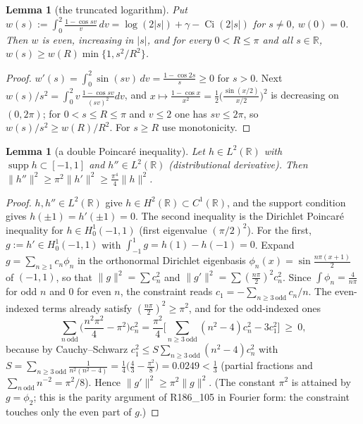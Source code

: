\documentclass[11pt]{amsart}
\newtheorem{lemma}[theorem]{Lemma}
\theoremstyle{definition}
\theoremstyle{remark}
\newcommand{\R}{\mathbb R}
\newcommand{\supp}{\operatorname{supp}}
\begin{document}
\begin{lemma}[the truncated logarithm]\label{lem:coer-w}
Put $w(s):=\int_0^2\frac{1-\cos sv}v\,dv=\log(2|s|)+\gamma-\operatorname{Ci}(2|s|)$ for $s\ne0$, $w(0)=0$.
Then $w$ is even, increasing in $|s|$, and for every $0<R\le\pi$ and all $s\in\R$,
$w(s)\ge w(R)\min\{1,s^2/R^2\}$.
\end{lemma}
\begin{proof}
$w'(s)=\int_0^2\sin(sv)\,dv=\frac{1-\cos2s}s\ge0$ for $s>0$. Next $w(s)/s^2=\int_0^2v\,\frac{1-\cos sv}{(sv)^2}dv$,
and $x\mapsto\frac{1-\cos x}{x^2}=\frac12\big(\frac{\sin(x/2)}{x/2}\big)^2$ is decreasing on $(0,2\pi)$;
for $0<s\le R\le\pi$ and $v\le2$ one has $sv\le2\pi$, so $w(s)/s^2\ge w(R)/R^2$. For $s\ge R$ use monotonicity.
\end{proof}

\begin{lemma}[a double Poincar\'e inequality]\label{lem:coer-poinc}
Let $h\in L^2(\R)$ with $\supp h\subset[-1,1]$ and $h''\in L^2(\R)$ (distributional derivative). Then
$\|h''\|^2\ge\pi^2\|h'\|^2\ge\frac{\pi^4}4\|h\|^2$.
\end{lemma}
\begin{proof}
$h,h''\in L^2(\R)$ give $h\in H^2(\R)\subset C^1(\R)$, and the support condition gives $h(\pm1)=h'(\pm1)=0$.
The second inequality is the Dirichlet Poincar\'e inequality for $h\in H^1_0(-1,1)$ (first eigenvalue
$(\pi/2)^2$). For the first, $g:=h'\in H^1_0(-1,1)$ with $\int_{-1}^1g=h(1)-h(-1)=0$. Expand $g=\sum_{n\ge1}c_n\phi_n$
in the orthonormal Dirichlet eigenbasis $\phi_n(x)=\sin\frac{n\pi(x+1)}2$ of $(-1,1)$, so that
$\|g\|^2=\sum c_n^2$ and $\|g'\|^2=\sum(\frac{n\pi}2)^2c_n^2$. Since $\int\phi_n=\frac4{n\pi}$ for odd $n$ and
$0$ for even $n$, the constraint reads $c_1=-\sum_{n\ge3\ \mathrm{odd}}c_n/n$. The even-indexed terms already
satisfy $(\frac{n\pi}2)^2\ge\pi^2$, and for the odd-indexed ones
\[
\sum_{n\ \mathrm{odd}}\Big(\frac{n^2\pi^2}4-\pi^2\Big)c_n^2=\frac{\pi^2}4\Big[\sum_{n\ge3\ \mathrm{odd}}(n^2-4)c_n^2-3c_1^2\Big]\ \ge\ 0,
\]
because by Cauchy--Schwarz $c_1^2\le S\sum_{n\ge3\ \mathrm{odd}}(n^2-4)c_n^2$ with
$S=\sum_{n\ge3\ \mathrm{odd}}\frac1{n^2(n^2-4)}=\frac14\big(\frac43-\frac{\pi^2}8\big)=0.0249<\frac13$
(partial fractions and $\sum_{n\ \mathrm{odd}}n^{-2}=\pi^2/8$). Hence $\|g'\|^2\ge\pi^2\|g\|^2$. (The constant
$\pi^2$ is attained by $g=\phi_2$; this is the parity argument of R186\_105 in Fourier form: the constraint
touches only the even part of $g$.)
\end{proof}
\end{document}
